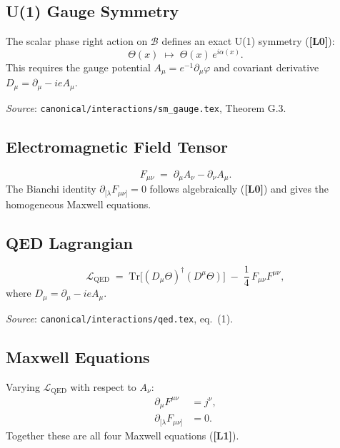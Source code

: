 \documentclass[12pt,a4paper]{article}
\newcommand{\Lzero}{\textbf{[L0]}}
\newcommand{\Lone}{\textbf{[L1]}}
\begin{document}
\subsection{U(1) Gauge Symmetry}

The scalar phase right action on $\mathcal{B}$ defines an exact U(1) symmetry
(\Lzero):
\begin{equation}
  \Theta(x) \;\mapsto\; \Theta(x)\,e^{i\alpha(x)}.
\end{equation}
This requires the gauge potential $A_\mu = e^{-1}\partial_\mu\varphi$
and covariant derivative $D_\mu = \partial_\mu - ieA_\mu$.

\textit{Source}: \texttt{canonical/interactions/sm\_gauge.tex}, Theorem G.3.

\subsection{Electromagnetic Field Tensor}

\begin{equation}
  F_{\mu\nu} \;=\; \partial_\mu A_\nu - \partial_\nu A_\mu.
\end{equation}
The Bianchi identity $\partial_{[\lambda}F_{\mu\nu]} = 0$ follows algebraically
(\Lzero) and gives the homogeneous Maxwell equations.

\subsection{QED Lagrangian}

\begin{equation}
  \mathcal{L}_{\mathrm{QED}}
  \;=\;
  \mathrm{Tr}\bigl[(D_\mu\Theta)^\dagger(D^\mu\Theta)\bigr]
  \;-\;
  \frac{1}{4}\,F_{\mu\nu}F^{\mu\nu},
\end{equation}
where $D_\mu = \partial_\mu - ieA_\mu$.

\textit{Source}: \texttt{canonical/interactions/qed.tex}, eq.\ (1).

\subsection{Maxwell Equations}

Varying $\mathcal{L}_{\mathrm{QED}}$ with respect to $A_\nu$:
\begin{align}
  \partial_\mu F^{\mu\nu} &= j^\nu, \label{eq:maxwell_inhom} \\
  \partial_{[\lambda}F_{\mu\nu]} &= 0. \label{eq:maxwell_hom}
\end{align}
Together these are all four Maxwell equations (\Lone).
\end{document}
